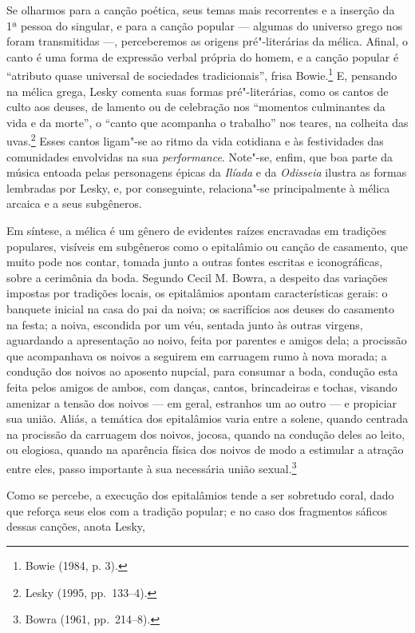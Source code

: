 Se olharmos para a canção poética, seus temas mais recorrentes e a inserção da
1ª pessoa do singular, e para a canção popular --- algumas do universo grego nos
foram transmitidas ---, perceberemos as origens pré"-literárias da mélica. Afinal,
o canto é uma forma de expressão verbal própria do homem, e a canção popular é
“atributo quase universal de sociedades tradicionais”, frisa Bowie.\footnote{
Bowie (1984, p. 3).} E, pensando na mélica grega, Lesky comenta suas formas
pré"-literárias, como os cantos de culto aos deuses, de lamento ou de celebração
nos “momentos culminantes da vida e da morte”, o “canto que acompanha o
trabalho” nos teares, na colheita das uvas.\footnote{ Lesky (1995, pp.~133--4).} Esses cantos ligam"-se ao ritmo da
vida cotidiana e às festividades das comunidades envolvidas na sua
\textit{performance}. Note"-se, enfim, que boa parte da música entoada pelas
personagens épicas da \textit{Ilíada} e da \textit{Odisseia} ilustra as formas
lembradas por Lesky, e, por conseguinte, relaciona"-se principalmente à mélica
arcaica e a seus subgêneros.

Em síntese, a mélica é um gênero de evidentes raízes
encravadas em tradições populares, visíveis em subgêneros
como o epitalâmio ou canção de casamento, que muito pode nos contar, tomada
junto a outras fontes escritas e iconográficas, sobre a cerimônia
da boda. Segundo Cecil M. Bowra, a despeito das variações
impostas por tradições locais, os epitalâmios apontam características gerais:
o banquete inicial na casa do pai da noiva; os sacrifícios aos
deuses do casamento na festa; a noiva, escondida por um véu, sentada junto às
outras virgens, aguardando a apresentação ao noivo, feita por parentes e amigos
dela; a procissão que acompanhava os noivos a seguirem em carruagem rumo à nova
morada; a condução dos noivos ao aposento nupcial, para consumar a boda,
condução esta feita pelos amigos de ambos, com danças, cantos, brincadeiras e
tochas, visando amenizar a tensão dos noivos --- em geral, estranhos um ao outro
--- e propiciar sua união. Aliás, a temática dos epitalâmios varia entre a
solene, quando centrada na procissão da carruagem dos noivos, jocosa, quando na
condução deles ao leito, ou elogiosa, quando na aparência física dos noivos de
modo a estimular a atração entre eles, passo importante à sua necessária união
sexual.\footnote{ Bowra (1961, pp.~214--8).}

Como se percebe, a execução dos epitalâmios tende a ser sobretudo coral, dado
que reforça seus elos com a tradição popular; e no caso dos fragmentos sáficos
dessas canções, anota Lesky, 

